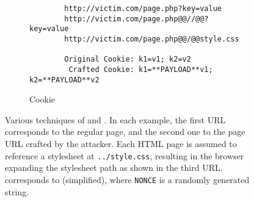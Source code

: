 \begin{figure}
    \begin{subfigure}[t]{1\linewidth}
        \begin{lstlisting}
        http://victim.com/page.php?key=value
        http://victim.com/page.php@@//@@?key=value
        http://victim.com/page.php@@/@@style.css

        Original Cookie: k1=v1; k2=v2
         Crafted Cookie: k1=**PAYLOAD**v1; k2=**PAYLOAD**v2
        \end{lstlisting}
        \caption{Cookie}
        \label{rpo:fig:taint:cookie}
    \end{subfigure}

    \caption{Various techniques of  and . In each example, the first URL corresponds to the regular page, and
    the second one to the page URL crafted by the attacker. Each HTML page is
    assumed to reference a stylesheet at \protect\texttt{../style.css}, resulting in the
    browser expanding the stylesheet path as shown in the third URL.
     corresponds to
     (simplified), where
    \texttt{NONCE} is a randomly generated string.}

    \label{rpo:fig:taint_techniques}
\end{figure}
